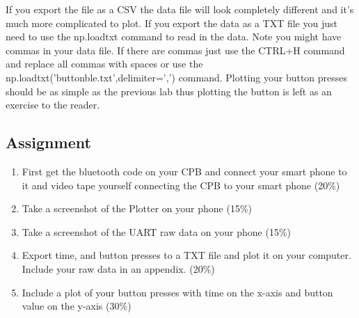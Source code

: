 If you export the file as a CSV the data file will look completely
different and it's much more complicated to plot. If you export the
data as a TXT file you just need to use the np.loadtxt command to read
in the data. Note you might have commas in your data file. If there
are commas just use the CTRL+H command and replace all commas with
spaces or use the np.loadtxt('buttonble.txt',delimiter=',')
command. Plotting your button presses should be as simple as the
previous lab thus plotting the button is left as an exercise to the
reader. 

\subsection{Assignment}



\begin{enumerate}[itemsep=-5pt]
\item First get the bluetooth code on your CPB and connect your smart phone to it and video tape yourself connecting the CPB to your smart phone (20\%)
\item Take a screenshot of the Plotter on your phone (15\%)
\item Take a screenshot of the UART raw data on your phone (15\%)
\item Export time, and button presses to a TXT file and plot it on
your computer. Include your raw data in an appendix. (20\%)
\item Include a plot of your button presses with time on the x-axis
and button value on the y-axis (30\%)
\end{enumerate}
